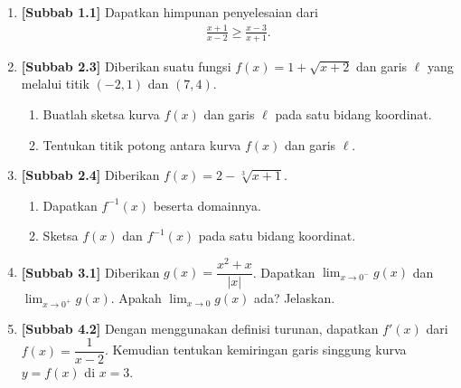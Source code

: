 \documentclass[10pt,openany,a4paper]{article}
\theoremstyle{definition}
\theoremstyle{definition}
\theoremstyle{plain}
\begin{document}
\begin{enumerate}
    \item \textbf{[Subbab 1.1]} Dapatkan himpunan penyelesaian dari
    \begin{align*}
        \frac{x+1}{x-2}\geq\frac{x-3}{x+1}.
    \end{align*}

    \item \textbf{[Subbab 2.3]} Diberikan suatu fungsi $f(x)=1+\sqrt{x+2}$ dan garis $\ell$ yang melalui titik $(-2,1)$ dan $(7,4)$.
    \begin{enumerate}
        \item Buatlah sketsa kurva $f(x)$ dan garis $\ell$ pada satu bidang koordinat.
        \item Tentukan titik potong antara kurva $f(x)$ dan garis $\ell$.
    \end{enumerate}

    \item \textbf{[Subbab 2.4]} Diberikan $f(x)=2-\sqrt[3]{x+1}$.
    \begin{enumerate}
        \item Dapatkan $f^{-1}(x)$ beserta domainnya.
        \item Sketsa $f(x)$ dan $f^{-1}(x)$ pada satu bidang koordinat.
    \end{enumerate}

    \item \textbf{[Subbab 3.1]} Diberikan $g(x)=\dfrac{x^2+x}{|x|}$. Dapatkan $\displaystyle\lim_{x\to 0^-}g(x)$ dan $\displaystyle\lim_{x\to 0^+}g(x)$. Apakah $\displaystyle\lim_{x\to 0}g(x)$ ada? Jelaskan.

    \item \textbf{[Subbab 4.2]} Dengan menggunakan definisi turunan, dapatkan $f'(x)$ dari $f(x)=\dfrac{1}{x-2}$. Kemudian tentukan kemiringan garis singgung kurva $y=f(x)$ di $x=3$.
\end{enumerate}

\newpage
\end{document}
